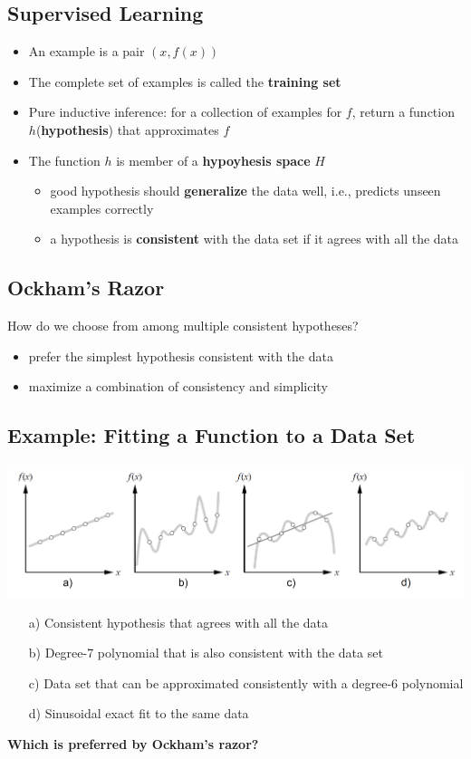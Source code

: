 \documentclass[conference]{styles/acmsiggraph}
\begin{document}
    \subsection{Supervised Learning}
        \begin{itemize}
            \item An example is a pair $(x,f(x))$
            \item The complete set of examples is called the \textbf{training set}
            \item Pure inductive inference: for a collection of examples for $f$, return a function $h$(\textbf{hypothesis}) that approximates $f$
            \item The function $h$ is member of a \textbf{hypoyhesis space} $H$
            \begin{itemize}
                \item good hypothesis should \textbf{generalize} the data well, i.e., predicts unseen examples correctly
                \item a hypothesis is \textbf{consistent} with the data set if it agrees with all the data
            \end{itemize}
        \end{itemize}
    
    \subsection{Ockham's Razor}
        How do we choose from among multiple consistent hypotheses?
        \begin{itemize}
            \item prefer the simplest hypothesis consistent with the data
            \item maximize a combination of consistency and simplicity
        \end{itemize}

    \subsection{Example: Fitting a Function to a Data Set}
        \includegraphics[width=1\textwidth]{imgs/Polynomials.png}
        \begin{itemize}
            \item[a)] Consistent hypothesis that agrees with all the data
            \item[b)] Degree-7 polynomial that is also consistent with the data set
            \item[c)] Data set that can be approximated consistently with a degree-6 polynomial
            \item[d)] Sinusoidal exact fit to the same data
        \end{itemize}
        \textbf{Which is preferred by Ockham's razor?}
\end{document}
